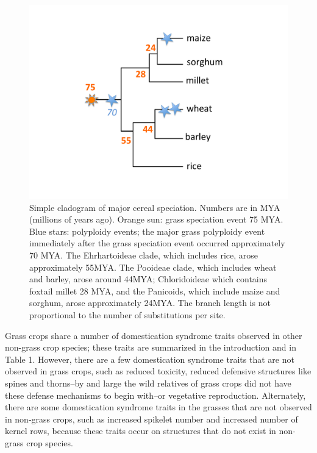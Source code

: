 \documentclass[12pt]{article}
\begin{document}
\begin{figure}[h]
    \centering
    \includegraphics[width=15cm]{Figure_1.pdf}
    \caption{Simple cladogram of major cereal speciation. Numbers are in MYA (millions of years ago).
Orange sun: grass speciation event 75 MYA.  Blue stars: polyploidy events; 
the major grass polyploidy event immediately after the grass speciation event occurred 
approximately 70 MYA. The Ehrhartoideae clade, which includes rice, arose 
approximately 55MYA. The Pooideae clade, which includes wheat and barley, 
arose around 44MYA; Chloridoideae which contains foxtail millet 28 MYA, and the Panicoids, 
which include maize and sorghum, arose approximately 24MYA. The branch length is not 
proportional to the number of substitutions per site.
}
    \label{fig:grassphylo}
\end{figure}

Grass crops share a number of domestication syndrome traits observed in other non-grass crop species; these traits are summarized in the introduction and in Table 1.
However, there are a few domestication syndrome traits that are not observed in grass crops, such as reduced toxicity, reduced defensive structures like spines and thorns--by and large the wild relatives of grass crops did not have these defense mechanisms to begin with--or vegetative reproduction.
Alternately, there are some domestication syndrome traits in the grasses that are not observed in non-grass crops, such as increased spikelet number and increased number of kernel rows, because these traits occur on structures that do not exist in non-grass crop species.  
\end{document}
